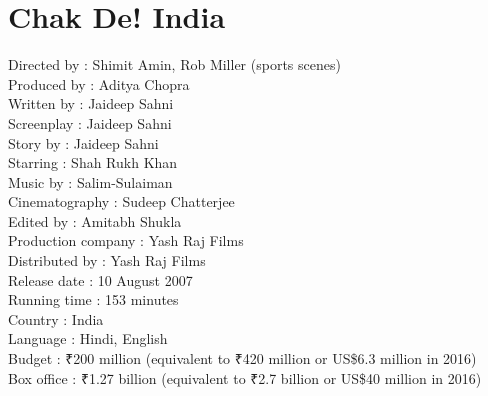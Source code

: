 \documentclass[11pt]{article}
\begin{document}
\section*{Chak De! India}
\noindent
Directed by	: Shimit Amin, Rob Miller (sports scenes)\\
Produced by	: Aditya Chopra\\
Written by	: Jaideep Sahni\\
Screenplay  :	Jaideep Sahni\\
Story by	: Jaideep Sahni\\
Starring	: Shah Rukh Khan\\
Music by	: Salim-Sulaiman\\
Cinematography	: Sudeep Chatterjee\\
Edited by	: Amitabh Shukla\\
Production company : Yash Raj Films\\
Distributed by : Yash Raj Films\\
Release date : 10 August 2007\\
Running time : 153 minutes\\
Country	: India\\
Language : Hindi, English\\
Budget : ₹200 million (equivalent to ₹420 million or US\$6.3 million in 2016)\\
Box office : ₹1.27 billion (equivalent to ₹2.7 billion or US\$40 million in 2016)\\
\end{document}
